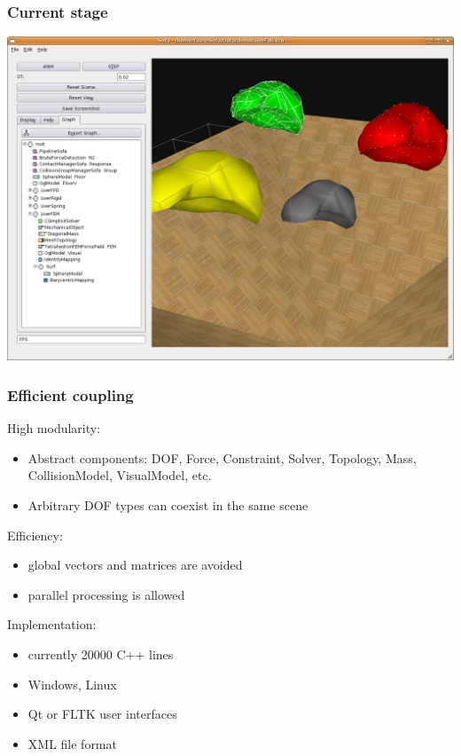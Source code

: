 \documentclass[a4paper,compress]{beamer}
\begin{document}
\begin{frame}
 \frametitle{Current stage}
\begin{center}
 \includegraphics[width=\linewidth]{snapshotSofa1.png}
\end{center}

\end{frame}


\begin{frame}
 \frametitle{Efficient coupling}
High modularity:
\begin{itemize}
 \item Abstract components: DOF, Force, Constraint, Solver, Topology, Mass, CollisionModel, VisualModel, etc. 
 \item Arbitrary DOF types can coexist in the same scene
\end{itemize}
Efficiency:
\begin{itemize}
 \item global vectors and matrices are avoided
 \item parallel processing is allowed
\end{itemize}
Implementation:
\begin{itemize}
 \item currently 20000 C++ lines
 \item Windows, Linux
 \item Qt or FLTK user interfaces
 \item XML file format
\end{itemize}

\end{frame}


\end{document}
